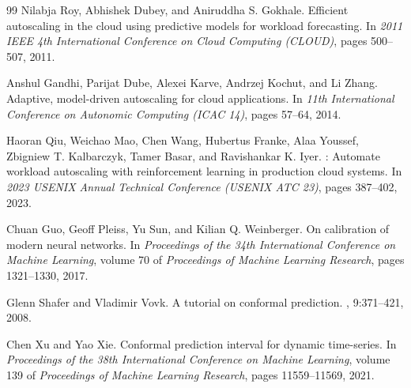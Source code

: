 \documentclass[11pt]{article}
\theoremstyle{plain}
\theoremstyle{definition}
\theoremstyle{remark}
\begin{document}
\begin{thebibliography}{99}
Nilabja Roy, Abhishek Dubey, and Aniruddha S. Gokhale.
\newblock Efficient autoscaling in the cloud using predictive models for workload forecasting.
\newblock In {\em 2011 IEEE 4th International Conference on Cloud Computing (CLOUD)}, pages 500--507, 2011.

Anshul Gandhi, Parijat Dube, Alexei Karve, Andrzej Kochut, and Li Zhang.
\newblock Adaptive, model-driven autoscaling for cloud applications.
\newblock In {\em 11th International Conference on Autonomic Computing (ICAC 14)}, pages 57--64, 2014.

Haoran Qiu, Weichao Mao, Chen Wang, Hubertus Franke, Alaa Youssef, Zbigniew T. Kalbarczyk, Tamer Basar, and Ravishankar K. Iyer.
: Automate workload autoscaling with reinforcement learning in production cloud systems.
\newblock In {\em 2023 USENIX Annual Technical Conference (USENIX ATC 23)}, pages 387--402, 2023.

Chuan Guo, Geoff Pleiss, Yu Sun, and Kilian Q. Weinberger.
\newblock On calibration of modern neural networks.
\newblock In {\em Proceedings of the 34th International Conference on Machine Learning}, volume 70 of {\em Proceedings of Machine Learning Research}, pages 1321--1330, 2017.

Glenn Shafer and Vladimir Vovk.
\newblock A tutorial on conformal prediction.
, 9:371--421, 2008.

Chen Xu and Yao Xie.
\newblock Conformal prediction interval for dynamic time-series.
\newblock In {\em Proceedings of the 38th International Conference on Machine Learning}, volume 139 of {\em Proceedings of Machine Learning Research}, pages 11559--11569, 2021.
\end{thebibliography}
\end{document}
